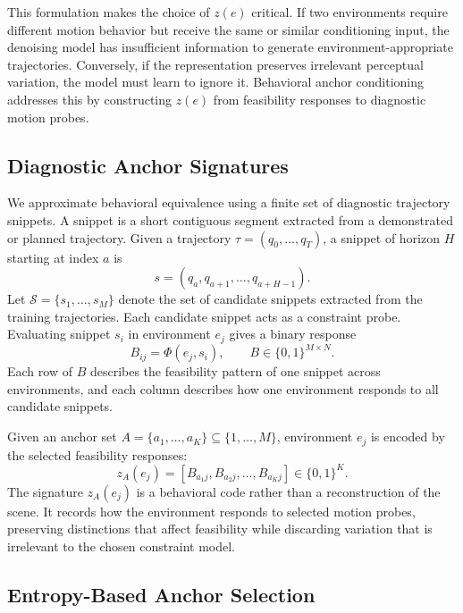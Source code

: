 This formulation makes the choice of $z(e)$ critical. If two environments require different motion behavior but receive the same or similar conditioning input, the denoising model has insufficient information to generate environment-appropriate trajectories. Conversely, if the representation preserves irrelevant perceptual variation, the model must learn to ignore it. Behavioral anchor conditioning addresses this by constructing $z(e)$ from feasibility responses to diagnostic motion probes.

\subsection{Diagnostic Anchor Signatures}

We approximate behavioral equivalence using a finite set of diagnostic trajectory snippets. A snippet is a short contiguous segment extracted from a demonstrated or planned trajectory. Given a trajectory $\tau=(q_0,\ldots,q_T)$, a snippet of horizon $H$ starting at index $a$ is
%
\begin{equation}
s=(q_a,q_{a+1},\ldots,q_{a+H-1}).
\end{equation}
%
Let $\mathcal{S}=\{s_1,\ldots,s_M\}$ denote the set of candidate snippets extracted from the training trajectories. Each candidate snippet acts as a constraint probe. Evaluating snippet $s_i$ in environment $e_j$ gives a binary response
%
\begin{equation}
B_{ij} = \Phi(e_j,s_i),
\qquad
B\in\{0,1\}^{M\times N}.
\end{equation}
%
Each row of $B$ describes the feasibility pattern of one snippet across environments, and each column describes how one environment responds to all candidate snippets.

Given an anchor set $A=\{a_1,\ldots,a_K\}\subseteq \{1,\ldots,M\}$, environment $e_j$ is encoded by the selected feasibility responses:
%
\begin{equation}
z_A(e_j)
=
\left[
B_{a_1j},
B_{a_2j},
\ldots,
B_{a_Kj}
\right]
\in\{0,1\}^{K}.
\end{equation}
%
The signature $z_A(e_j)$ is a behavioral code rather than a reconstruction of the scene. It records how the environment responds to selected motion probes, preserving distinctions that affect feasibility while discarding variation that is irrelevant to the chosen constraint model.

\subsection{Entropy-Based Anchor Selection}

